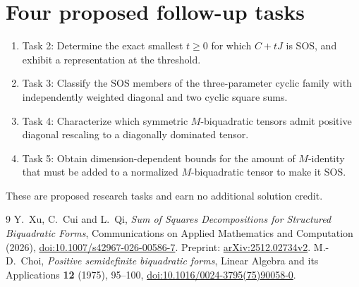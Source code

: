 \documentclass[11pt]{article}
\begin{document}
\section*{Four proposed follow-up tasks}
\begin{enumerate}
\item Task 2: Determine the exact smallest $t\ge0$ for which $C+tJ$
is SOS, and exhibit a representation at the threshold.
\item Task 3: Classify the SOS members of the three-parameter cyclic
family with independently weighted diagonal and two cyclic square sums.
\item Task 4: Characterize which symmetric $M$-biquadratic tensors
admit positive diagonal rescaling to a diagonally dominated tensor.
\item Task 5: Obtain dimension-dependent bounds for the amount of
$M$-identity that must be added to a normalized $M$-biquadratic tensor
to make it SOS.
\end{enumerate}
These are proposed research tasks and earn no additional solution credit.

\begin{thebibliography}{9}
 Y.~Xu, C.~Cui and L.~Qi,
\emph{Sum of Squares Decompositions for Structured Biquadratic Forms},
Communications on Applied Mathematics and Computation (2026),
\href{https://doi.org/10.1007/s42967-026-00586-7}{doi:10.1007/s42967-026-00586-7}.
Preprint: \href{https://arxiv.org/abs/2512.02734v2}{arXiv:2512.02734v2}.
 M.-D.~Choi,
\emph{Positive semidefinite biquadratic forms},
Linear Algebra and its Applications \textbf{12} (1975), 95--100,
\href{https://doi.org/10.1016/0024-3795(75)90058-0}{doi:10.1016/0024-3795(75)90058-0}.
\end{thebibliography}
\end{document}
